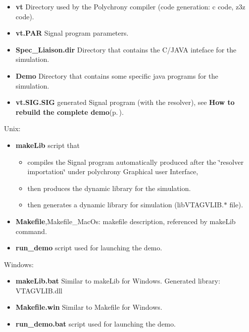 \begin{itemize}
\item {\bf vt} Directory used by the Polychrony compiler (code generation: c code, z3z code).\end{itemize}


\begin{itemize}
\item {\bf vt.PAR} Signal program parameters.\end{itemize}


\begin{itemize}
\item {\bf Spec\_\-Liaison.dir} Directory that contains the C/JAVA inteface for the simulation.\end{itemize}


\begin{itemize}
\item {\bf Demo} Directory that contains some specific java programs for the simulation.\end{itemize}


\begin{itemize}
\item {\bf vt.SIG.SIG} generated Signal program (with the resolver), see {\bf How to rebuild the complete demo}{\rm (p.\,\pageref{index_sectB})}.\end{itemize}


Unix:

\begin{itemize}
\item {\bf make\-Lib} script that\begin{itemize}
\item compiles the Signal program automatically produced after the \char`\"{}resolver importation\char`\"{} under polychrony Graphical user Interface,\item then produces the dynamic library for the simulation.\item then generates a dynamic library for simulation (lib\-VTAGVLIB.$\ast$ file).\end{itemize}
\item {\bf Makefile},Makefile\_\-Mac\-Os: makefile description, referenced by make\-Lib command.\item {\bf run\_\-demo} script used for launching the demo.\end{itemize}


Windows:\begin{itemize}
\item {\bf make\-Lib.bat} Similar to make\-Lib for Windows. Generated library: VTAGVLIB.dll\item {\bf Makefile.win} Similar to Makefile for Windows.\item {\bf run\_\-demo.bat} script used for launching the demo.\end{itemize}
